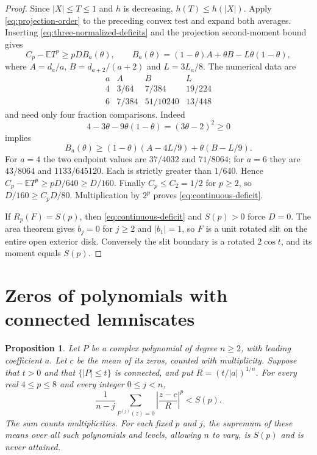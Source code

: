 \documentclass[11pt]{article}
\newtheorem{proposition}[theorem]{Proposition}
\newcommand{\E}{\mathbb E}
\begin{document}
\begin{proof}
		Since $|X|\le T\le1$ and $h$ is decreasing, $h(T)\le h(|X|)$.
		Apply \eqref{eq:projection-order} to the preceding convex test and
		expand both averages.  Inserting \eqref{eq:three-normalized-deficits}
		and the projection second-moment bound gives
		\begin{equation}\label{eq:interpolation-bracket}
			C_p-\E T^p\ge pD B_a(\theta),\qquad
			B_a(\theta)=(1-\theta)A+\theta B-L\theta(1-\theta),
		\end{equation}
		where $A=d_a/a$, $B=d_{a+2}/(a+2)$ and $L=3L_a/8$.
		The numerical data are
		\[
		\begin{array}{c|ccc}
			a&A&B&L\\ \hline
			4&3/64&7/384&19/224\\
			6&7/384&51/10240&13/448
		\end{array}
		\]
		and need only four fraction comparisons.  Indeed
		\[
		4-3\theta-9\theta(1-\theta)=(3\theta-2)^2\ge0
		\]
		implies
		\[
		B_a(\theta)\ge
		(1-\theta)(A-4L/9)+\theta(B-L/9).
		\]
		For $a=4$ the two endpoint values are $37/4032$ and $71/8064$;
		for $a=6$ they are $43/8064$ and $1133/645120$.
		Each is strictly greater than $1/640$.  Hence
		$C_p-\E T^p\ge pD/640\ge D/160$.
		Finally $C_p\le C_2=1/2$ for $p\ge2$, so
		$D/160\ge C_pD/80$.  Multiplication by $2^p$ proves
		\eqref{eq:continuous-deficit}.
		
		If $R_p(F)=S(p)$, then \eqref{eq:continuous-deficit} and $S(p)>0$
		force $D=0$.  The area theorem gives $b_j=0$ for $j\ge2$ and
		$|b_1|=1$, so $F$ is a unit rotated slit on the entire open exterior
		disk.  Conversely the slit boundary is a rotated $2\cos t$, and its
		moment equals $S(p)$.
	\end{proof}
	\section{Zeros of polynomials with connected lemniscates}
	\label{sec:polynomial-zero-comparison}
	
	\begin{proposition}\label{prop:zero-moments}
		Let $P$ be a complex polynomial of degree $n\ge2$, with leading
		coefficient $a$. Let $c$ be the mean of its zeros, counted with
		multiplicity. Suppose that $t>0$ and that $\{|P|\le t\}$ is connected,
		and put $R=(t/|a|)^{1/n}$. For every real $4\le p\le8$ and every
		integer $0\le j<n$,
		\[
		\frac1{n-j}\sum_{P^{(j)}(z)=0}
		\left|\frac{z-c}{R}\right|^p < S(p).
		\]
		The sum counts multiplicities. For each fixed $p$ and $j$, the
		supremum of these means over all such polynomials and levels,
		allowing $n$ to vary, is $S(p)$ and is never attained.
	\end{proposition}
	
\end{document}

